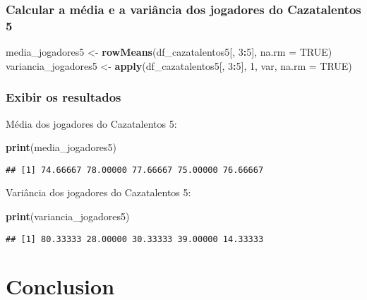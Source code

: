 \documentclass[
]{article}
\newenvironment{Shaded}{\begin{snugshade}}{\end{snugshade}}
\newcommand{\AttributeTok}[1]{\textcolor[rgb]{0.13,0.29,0.53}{#1}}
\newcommand{\ConstantTok}[1]{\textcolor[rgb]{0.56,0.35,0.01}{#1}}
\newcommand{\DecValTok}[1]{\textcolor[rgb]{0.00,0.00,0.81}{#1}}
\newcommand{\FunctionTok}[1]{\textcolor[rgb]{0.13,0.29,0.53}{\textbf{#1}}}
\newcommand{\NormalTok}[1]{#1}
\newcommand{\OtherTok}[1]{\textcolor[rgb]{0.56,0.35,0.01}{#1}}
\newcommand{\SpecialCharTok}[1]{\textcolor[rgb]{0.81,0.36,0.00}{\textbf{#1}}}
\begin{document}
\hypertarget{calcular-a-muxe9dia-e-a-variuxe2ncia-dos-jogadores-do-cazatalentos-5}{%
\subsubsection{Calcular a média e a variância dos jogadores do
Cazatalentos
5}\label{calcular-a-muxe9dia-e-a-variuxe2ncia-dos-jogadores-do-cazatalentos-5}}

\begin{Shaded}
\begin{Highlighting}[]
\NormalTok{media\_jogadores5 }\OtherTok{\textless{}{-}} \FunctionTok{rowMeans}\NormalTok{(df\_cazatalentos5[, }\DecValTok{3}\SpecialCharTok{:}\DecValTok{5}\NormalTok{], }\AttributeTok{na.rm =} \ConstantTok{TRUE}\NormalTok{)}
\NormalTok{variancia\_jogadores5 }\OtherTok{\textless{}{-}} \FunctionTok{apply}\NormalTok{(df\_cazatalentos5[, }\DecValTok{3}\SpecialCharTok{:}\DecValTok{5}\NormalTok{], }\DecValTok{1}\NormalTok{, var, }\AttributeTok{na.rm =} \ConstantTok{TRUE}\NormalTok{)}
\end{Highlighting}
\end{Shaded}

\hypertarget{exibir-os-resultados}{%
\subsubsection{Exibir os resultados}\label{exibir-os-resultados}}

Média dos jogadores do Cazatalentos 5:

\begin{Shaded}
\begin{Highlighting}[]
\FunctionTok{print}\NormalTok{(media\_jogadores5)}
\end{Highlighting}
\end{Shaded}

\begin{verbatim}
## [1] 74.66667 78.00000 77.66667 75.00000 76.66667
\end{verbatim}

Variância dos jogadores do Cazatalentos 5:

\begin{Shaded}
\begin{Highlighting}[]
\FunctionTok{print}\NormalTok{(variancia\_jogadores5)}
\end{Highlighting}
\end{Shaded}

\begin{verbatim}
## [1] 80.33333 28.00000 30.33333 39.00000 14.33333
\end{verbatim}

\hypertarget{conclusion}{%
\section{Conclusion}\label{conclusion}}
\end{document}
